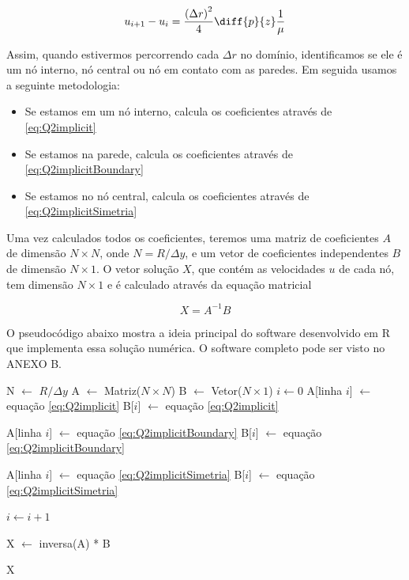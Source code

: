 \begin{equation}\label{eq:Q2implicitSimetria}
    u_{i+1} - u_i = \frac{\left(\Delta r\right)^2}{4} \diff{p}{z} \frac{1}{\mu}
\end{equation}

Assim, quando estivermos percorrendo cada $\Delta r$ no domínio, identificamos se ele é um nó interno, nó central ou
nó em contato com as paredes. Em seguida usamos a seguinte metodologia:

\begin{itemize}
    \item Se estamos em um nó interno, calcula os coeficientes através de \eqref{eq:Q2implicit}
    \item Se estamos na parede, calcula os coeficientes através de \eqref{eq:Q2implicitBoundary}
    \item Se estamos no nó central, calcula os coeficientes através de \eqref{eq:Q2implicitSimetria}
\end{itemize}

Uma vez calculados todos os coeficientes, teremos uma matriz de coeficientes $A$ de dimensão $N \times N$, onde
$N = R / \Delta y$, e um vetor de coeficientes independentes $B$ de dimensão $N \times 1$.
O vetor solução $X$, que contém as velocidades $u$ de cada nó, tem dimensão $N \times 1$ e é calculado através da
equação matricial

\begin{equation}\label{eq:Q2sistemalinear}
    X = A^{-1} B
\end{equation}

O pseudocódigo abaixo mostra a ideia principal do software desenvolvido em R que implementa
essa solução numérica. O software completo pode ser visto no ANEXO B.

\begin{algorithmic}
    \State N $\gets$ $R / \Delta y$
    \State A $\gets$ Matriz($N \times N$)
    \State B $\gets$ Vetor($N \times 1$)
    \State $i \gets 0$
            \State A[linha $i$] $\gets$ equação \eqref{eq:Q2implicit}
            \State B[$i$] $\gets$ equação \eqref{eq:Q2implicit}
        \EndIf

            \State A[linha $i$] $\gets$ equação \eqref{eq:Q2implicitBoundary}
            \State B[$i$] $\gets$ equação \eqref{eq:Q2implicitBoundary}
        \EndIf

            \State A[linha $i$] $\gets$ equação \eqref{eq:Q2implicitSimetria}
            \State B[$i$] $\gets$ equação \eqref{eq:Q2implicitSimetria}
        \EndIf

        \State $i \gets i + 1$
    \EndFor

    \State X $\gets$ inversa(A) * B

    \Return X
\end{algorithmic}

